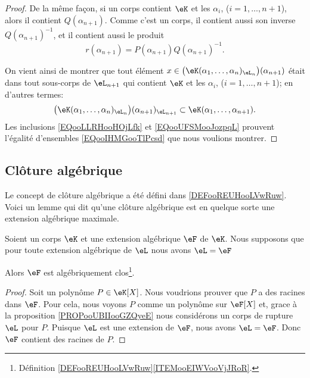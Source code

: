 \begin{proof}
	De la même façon, si un corps contient \( \eK\) et les \( \alpha_i\), (\( i=1,\ldots, n+1\)), alors il contient \( Q(\alpha_{n+1})\). Comme c'est un corps, il contient aussi son inverse \( Q(\alpha_{n+1})^{-1}\), et il contient aussi le produit
	\begin{equation}
		r(\alpha_{n+1})=P(\alpha_{n+1})Q(\alpha_{n+1})^{-1}.
	\end{equation}

	On vient ainsi de montrer que tout élément \( x \in  \big( \eK(\alpha_1,\ldots, \alpha_n)_{\eL_n} \big)(\alpha_{n+1})\) était dans tout sous-corps de \( \eL_{n+1} \) qui contient \( \eK \) et les \( \alpha_i\), (\( i=1,\ldots, n+1\)); en d'autres termes:
	\begin{equation}\label{EQooUFSMooJozpqL}
		\big( \eK(\alpha_1,\ldots, \alpha_n)_{\eL_n} \big)(\alpha_{n+1})_{\eL_{n+1}} \subset \eK(\alpha_1,\ldots,\alpha_{n+1}).
	\end{equation}
	Les inclusions \eqref{EQooLLRHooHOjLfk} et \eqref{EQooUFSMooJozpqL} prouvent l'égalité d'ensembles \eqref{EQooIHMGooTlPcsd} que nous voulions montrer.
\end{proof}

\subsection{Clôture algébrique}

Le concept de clôture algébrique a été défini dans \ref{DEFooREUHooLVwRuw}. Voici un lemme qui dit qu'une clôture algébrique est en quelque sorte une extension algébrique maximale.
\begin{lemma}        \label{LEMooQSCGooMyCktA}
	Soient un corps \( \eK\) et une extension algébrique \( \eF\) de \( \eK\). Nous supposons que pour toute extension algébrique de \( \eL\) nous avons \( \eL=\eF\)

	Alors \( \eF\) est algébriquement clos\footnote{Définition \ref{DEFooREUHooLVwRuw}\ref{ITEMooEIWVooVjJRoR}.}.
\end{lemma}

\begin{proof}
	Soit un polynôme \( P\in \eK[X]\). Nous voudrions prouver que \( P\) a des racines dans \( \eF\). Pour cela, nous voyons \( P\) comme un polynôme sur \( \eF[X]\) et, grace à la proposition \ref{PROPooUBIIooGZQyeE} nous considérons un corps de rupture \( \eL\) pour \( P\). Puisque \( \eL\) est une extension de \( \eF\), nous avons \( \eL=\eF\). Donc \( \eF\) contient des racines de \( P\).
\end{proof}


